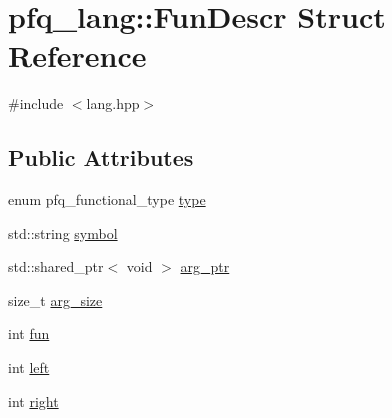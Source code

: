 \hypertarget{structpfq__lang_1_1FunDescr}{\section{pfq\+\_\+lang\+:\+:Fun\+Descr Struct Reference}
\label{structpfq__lang_1_1FunDescr}
}


{\ttfamily \#include $<$lang.\+hpp$>$}

\subsection*{Public Attributes}
\begin{DoxyCompactItemize}
\item 
enum pfq\+\_\+functional\+\_\+type \hyperlink{structpfq__lang_1_1FunDescr_a48a16971f3d255aed8551bc0690913cf}{type}
\item 
std\+::string \hyperlink{structpfq__lang_1_1FunDescr_a7d95e70cba06a41f63bcc960900c83ff}{symbol}
\item 
std\+::shared\+\_\+ptr$<$ void $>$ \hyperlink{structpfq__lang_1_1FunDescr_aa96cb2764befea1e5b8b61927e4a4871}{arg\+\_\+ptr}
\item 
size\+\_\+t \hyperlink{structpfq__lang_1_1FunDescr_a6690de6f15bab43587dadf2f88491ae4}{arg\+\_\+size}
\item 
int \hyperlink{structpfq__lang_1_1FunDescr_a073bf3b9daa315c7498dacd6d4c8266f}{fun}
\item 
int \hyperlink{structpfq__lang_1_1FunDescr_abdd618d54ab1e074a83d698d5a4b8197}{left}
\item 
int \hyperlink{structpfq__lang_1_1FunDescr_afaca33d533c4668acfd5e6aea52026b4}{right}
\end{DoxyCompactItemize}


